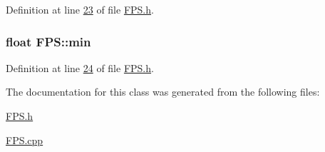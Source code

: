 Definition at line \hyperlink{_f_p_s_8h_source_l00023}{23} of file \hyperlink{_f_p_s_8h_source}{F\+P\+S.\+h}.

\hypertarget{class_f_p_s_af873eaf0d65931baa5f58415f024ccf7}{}
\subsubsection[{min}]{\setlength{\rightskip}{0pt plus 5cm}float F\+P\+S\+::min}\label{class_f_p_s_af873eaf0d65931baa5f58415f024ccf7}


Definition at line \hyperlink{_f_p_s_8h_source_l00024}{24} of file \hyperlink{_f_p_s_8h_source}{F\+P\+S.\+h}.



The documentation for this class was generated from the following files\+:\begin{DoxyCompactItemize}
\item 
\hyperlink{_f_p_s_8h}{F\+P\+S.\+h}\item 
\hyperlink{_f_p_s_8cpp}{F\+P\+S.\+cpp}\end{DoxyCompactItemize}
